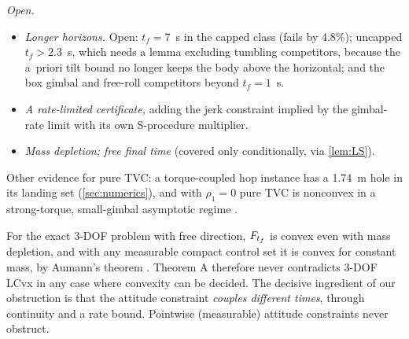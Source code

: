 \emph{Open.}
\begin{itemize}[leftmargin=*,itemsep=1pt]
\item \emph{Longer horizons.} Open: $t_f=7$~s in the capped class (fails by 4.8\%); uncapped $t_f>2.3$~s, which needs a lemma excluding
tumbling competitors, because the a~priori tilt bound no longer keeps the body above the horizontal; and the box gimbal and
free-roll competitors beyond $t_f=1$~s.
\item \emph{A rate-limited certificate,} adding the jerk constraint implied by the gimbal-rate limit with its own S-procedure
multiplier.
\item \emph{Mass depletion; free final time} (covered only conditionally, via \cref{lem:LS}).
\end{itemize}
Other evidence for pure TVC: a torque-coupled hop instance has a 1.74~m hole in its landing set (\cref{sec:numerics}), and with
$\rho_1=0$ pure TVC is nonconvex in a strong-torque, small-gimbal asymptotic regime .

\begin{remark}\label{rem:3dof}
For the exact 3-DOF problem with free direction, $F_{t_f}$ is convex even with mass depletion, and with any measurable compact
control set it is convex for constant mass, by Aumann's theorem \Spending. Theorem A therefore never
contradicts 3-DOF LCvx in any case where convexity can be decided. The decisive ingredient of our obstruction is that the
attitude constraint \emph{couples different times}, through continuity and a rate bound. Pointwise (measurable) attitude
constraints never obstruct.
\end{remark}
